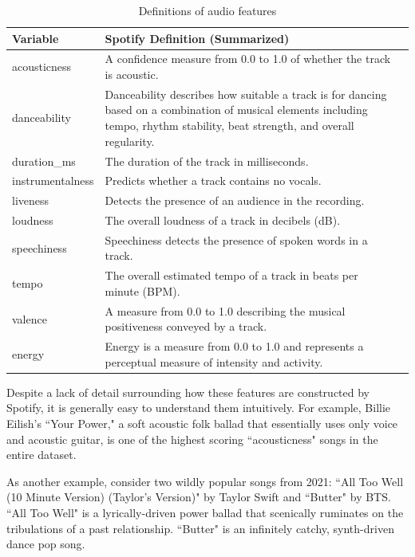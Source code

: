 \documentclass[12pt, twoside]{article}
\begin{document}
\begin{table}[H]
\centering
\caption{Definitions of audio features}
\label{tab:results}
\def\arraystretch{1.5}
\begin{tabular}{l  p{10cm}  p{3.4cm}} %
\hline
Variable & Spotify Definition (Summarized) \\ \hline
acousticness & A confidence measure from 0.0 to 1.0 of whether the track is acoustic. \\
danceability & Danceability describes how suitable a track is for dancing based on a combination of musical elements including tempo, rhythm stability, beat strength, and overall regularity. \\
duration\_ms & The duration of the track in milliseconds. \\
instrumentalness & Predicts whether a track contains no vocals. \\
liveness & Detects the presence of an audience in the recording. \\
loudness & The overall loudness of a track in decibels (dB). \\
speechiness & Speechiness detects the presence of spoken words in a track. \\
tempo & The overall estimated tempo of a track in beats per minute (BPM). \\
valence & A measure from 0.0 to 1.0 describing the musical positiveness conveyed by a track. \\
energy & Energy is a measure from 0.0 to 1.0 and represents a perceptual measure of intensity and activity.
\label{table:audio_features}
\end{tabular}
\end{table}
Despite a lack of detail surrounding how these features are constructed by Spotify, it is generally easy to understand them intuitively. For example, Billie Eilish's ``Your Power," a soft acoustic folk ballad that essentially uses only voice and acoustic guitar, is one of the highest scoring ``acousticness" songs in the entire dataset. 

As another example, consider two wildly popular songs from 2021: ``All Too Well (10 Minute Version) (Taylor's Version)" by Taylor Swift and ``Butter" by BTS. ``All Too Well" is a lyrically-driven power ballad that scenically ruminates on the tribulations of a past relationship. ``Butter" is an infinitely catchy, synth-driven dance pop song.
\end{document}
